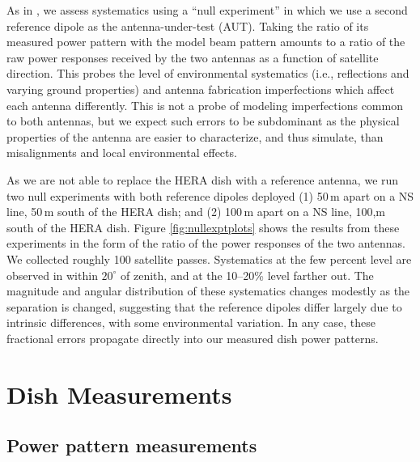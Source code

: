 \documentclass{emulateapj}
\begin{document}
As in \citet{neben15}, we assess systematics using a ``null experiment'' in which we use a second reference dipole as the antenna-under-test (AUT). Taking the ratio of its measured power pattern with the model beam pattern amounts to a ratio of the raw power responses received by the two antennas as a function of satellite direction. This probes the level of environmental systematics (i.e., reflections and varying ground properties) and antenna fabrication imperfections which affect each antenna differently. This is not a probe of modeling imperfections common to both antennas, but we expect such errors to be subdominant as the physical properties of the antenna are easier to characterize, and thus simulate, than misalignments and local environmental effects. 

As we are not able to replace the HERA dish with a reference antenna, we run two null experiments with both reference dipoles deployed (1) 50\,m apart on a NS line, 50\,m south of the HERA dish; and (2) 100\,m apart on a NS line, 100,m south of the HERA dish. Figure \ref{fig:nullexptplots} shows the results from these experiments in the form of the ratio of the power responses of the two antennas. We collected roughly 100 satellite passes. Systematics at the few percent level are observed in  within $20^\circ$ of zenith, and at the 10--20\% level farther out. The magnitude and angular distribution of these systematics changes modestly as the separation is changed, suggesting that the reference dipoles differ largely due to intrinsic differences, with some environmental variation. In any case, these fractional errors propagate directly into our measured dish power patterns.

\section{Dish Measurements}

\subsection{Power pattern measurements}
\end{document}

